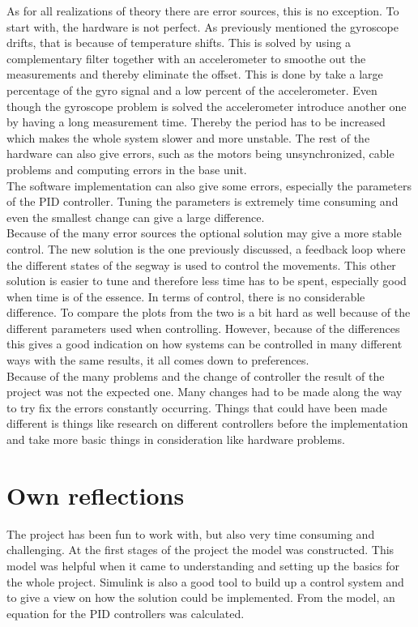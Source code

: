 \documentclass[a4paper]{article}
\begin{document}
As for all realizations of theory there are error sources, this is no exception. To start with, the hardware is not perfect. As previously mentioned the gyroscope drifts, that is because of temperature shifts. This is solved by using a complementary filter together with an accelerometer to smoothe out the measurements and thereby eliminate the offset. This is done by take a large percentage of the gyro signal and a low percent of the accelerometer. Even though the gyroscope problem is solved the accelerometer introduce another one by having a long measurement time. Thereby the period has to be increased which makes the whole system slower and more unstable. The rest of the hardware can also give errors, such as the motors being unsynchronized, cable problems and computing errors in the base unit.\\

The software implementation can also give some errors, especially the parameters of the PID controller. Tuning the parameters is extremely time consuming and even the smallest change can give a large difference.\\

Because of the many error sources the optional solution may give a more stable control. The new solution is the one previously discussed, a feedback loop where the different states of the segway is used to control the movements. This other solution is easier to tune and therefore less time has to be spent, especially good when time is of the essence. In terms of control, there is no considerable difference. To compare the plots from the two is a bit hard as well because of the different parameters used when controlling. However, because of the differences this gives a good indication on how systems can be controlled in many different ways with the same results, it all comes down to preferences. \\

Because of the many problems and the change of controller the result of the project was not the expected one. Many changes had  to be made along the way to try fix the errors constantly occurring. Things that could have been made different is things like research on different controllers before the implementation and take more basic things in consideration like hardware problems.   


\section{Own reflections}
The project has been fun to work with, but also very time consuming and challenging. At the first stages of the project the model was constructed. This model was helpful when it came to understanding and setting up the basics for the whole project. Simulink is also a good tool to build up a control system and to give a view on how the solution could be implemented. From the model, an equation for the PID controllers was calculated. \\
\end{document}
